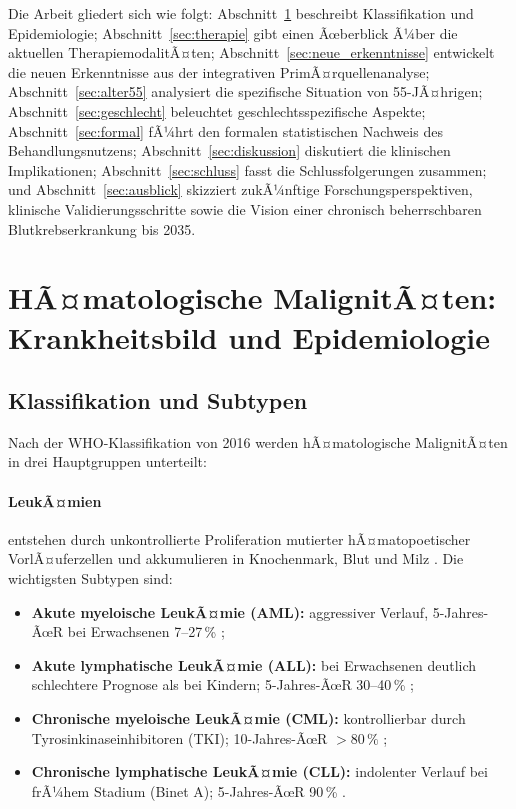 ﻿\documentclass[12pt,a4paper]{article}
\theoremstyle{definition}
\begin{document}
Die Arbeit gliedert sich wie folgt: Abschnitt~\ref{sec:epidemiologie} beschreibt
Klassifikation und Epidemiologie; Abschnitt~\ref{sec:therapie} gibt einen Ãœberblick
Ã¼ber die aktuellen TherapiemodalitÃ¤ten; Abschnitt~\ref{sec:neue_erkenntnisse}
entwickelt die neuen Erkenntnisse aus der integrativen PrimÃ¤rquellenanalyse;
Abschnitt~\ref{sec:alter55} analysiert die spezifische Situation von 55-JÃ¤hrigen;
Abschnitt~\ref{sec:geschlecht} beleuchtet geschlechtsspezifische Aspekte;
Abschnitt~\ref{sec:formal} fÃ¼hrt den formalen statistischen Nachweis des
Behandlungsnutzens; Abschnitt~\ref{sec:diskussion} diskutiert die klinischen
Implikationen; Abschnitt~\ref{sec:schluss} fasst die Schlussfolgerungen zusammen;
und Abschnitt~\ref{sec:ausblick} skizziert zukÃ¼nftige Forschungsperspektiven,
klinische Validierungsschritte sowie die Vision einer chronisch beherrschbaren
Blutkrebserkrankung bis 2035.

\section{HÃ¤matologische MalignitÃ¤ten: Krankheitsbild und Epidemiologie}
\label{sec:epidemiologie}

\subsection{Klassifikation und Subtypen}

Nach der WHO-Klassifikation von 2016 \cite{swerdlow2016} werden hÃ¤matologische
MalignitÃ¤ten in drei Hauptgruppen unterteilt:

\paragraph{LeukÃ¤mien} entstehen durch unkontrollierte Proliferation mutierter
hÃ¤matopoetischer VorlÃ¤uferzellen und akkumulieren in Knochenmark, Blut und Milz
\cite{adeyemi2025}. Die wichtigsten Subtypen sind:
\begin{itemize}
  \item \textbf{Akute myeloische LeukÃ¤mie (AML):} aggressiver Verlauf, 5-Jahres-ÃœR
        bei Erwachsenen 7--27\,\% \cite{adeyemi2025,dohner2017};
  \item \textbf{Akute lymphatische LeukÃ¤mie (ALL):} bei Erwachsenen deutlich
        schlechtere Prognose als bei Kindern; 5-Jahres-ÃœR 30--40\,\%
        \cite{kantarjian2021};
  \item \textbf{Chronische myeloische LeukÃ¤mie (CML):} kontrollierbar durch
        Tyrosinkinaseinhibitoren (TKI); 10-Jahres-ÃœR $>80\,\%$ \cite{hochhaus2017};
  \item \textbf{Chronische lymphatische LeukÃ¤mie (CLL):} indolenter Verlauf bei
        frÃ¼hem Stadium (Binet A); 5-Jahres-ÃœR 90\,\% \cite{zenz2014}.
\end{itemize}
\end{document}
